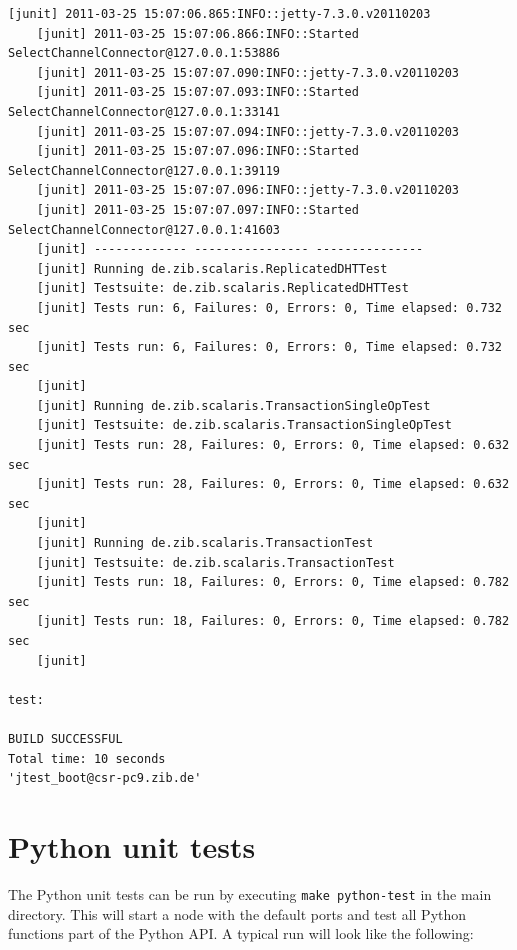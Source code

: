 \documentclass[a4paper]{scrreprt}
\newcommand{\code}[1]{\lstinline[basicstyle=\ttfamily]!#1!}
\begin{document}
\begin{lstlisting}[language={}]
    [junit] 2011-03-25 15:07:06.865:INFO::jetty-7.3.0.v20110203
    [junit] 2011-03-25 15:07:06.866:INFO::Started SelectChannelConnector@127.0.0.1:53886
    [junit] 2011-03-25 15:07:07.090:INFO::jetty-7.3.0.v20110203
    [junit] 2011-03-25 15:07:07.093:INFO::Started SelectChannelConnector@127.0.0.1:33141
    [junit] 2011-03-25 15:07:07.094:INFO::jetty-7.3.0.v20110203
    [junit] 2011-03-25 15:07:07.096:INFO::Started SelectChannelConnector@127.0.0.1:39119
    [junit] 2011-03-25 15:07:07.096:INFO::jetty-7.3.0.v20110203
    [junit] 2011-03-25 15:07:07.097:INFO::Started SelectChannelConnector@127.0.0.1:41603
    [junit] ------------- ---------------- ---------------
    [junit] Running de.zib.scalaris.ReplicatedDHTTest
    [junit] Testsuite: de.zib.scalaris.ReplicatedDHTTest
    [junit] Tests run: 6, Failures: 0, Errors: 0, Time elapsed: 0.732 sec
    [junit] Tests run: 6, Failures: 0, Errors: 0, Time elapsed: 0.732 sec
    [junit] 
    [junit] Running de.zib.scalaris.TransactionSingleOpTest
    [junit] Testsuite: de.zib.scalaris.TransactionSingleOpTest
    [junit] Tests run: 28, Failures: 0, Errors: 0, Time elapsed: 0.632 sec
    [junit] Tests run: 28, Failures: 0, Errors: 0, Time elapsed: 0.632 sec
    [junit] 
    [junit] Running de.zib.scalaris.TransactionTest
    [junit] Testsuite: de.zib.scalaris.TransactionTest
    [junit] Tests run: 18, Failures: 0, Errors: 0, Time elapsed: 0.782 sec
    [junit] Tests run: 18, Failures: 0, Errors: 0, Time elapsed: 0.782 sec
    [junit] 

test:

BUILD SUCCESSFUL
Total time: 10 seconds
'jtest_boot@csr-pc9.zib.de'
\end{lstlisting}

\section{Python unit tests}
The Python unit tests can be run by executing \code{make python-test} in the
main directory. This will start a \scalaris{} node with the default ports and test
all Python functions part of the Python API. A typical run will look like the
following:
\end{document}
